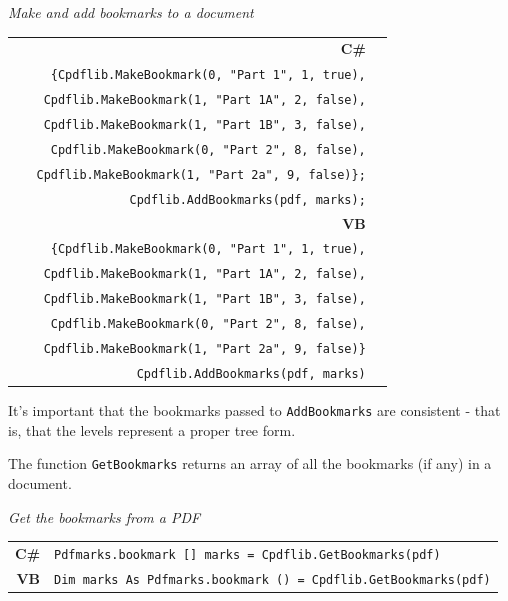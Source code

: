 \documentclass[a4paper]{memoir}
\begin{document}
\begin{framed}
\noindent\textit{Make and add bookmarks to a document}

\vspace{2mm}
\noindent\begin{tabular}{rl}
\small\sffamily\textbf{C\#} &
\begin{minipage}{4in}
\small\verb!Pdfmarks.bookmark [] marks =!\\
\small\verb!  {Cpdflib.MakeBookmark(0, "Part 1", 1, true),!\\
\small\verb!   Cpdflib.MakeBookmark(1, "Part 1A", 2, false),!\\
\small\verb!   Cpdflib.MakeBookmark(1, "Part 1B", 3, false),!\\
\small\verb!   Cpdflib.MakeBookmark(0, "Part 2", 8, false),!\\
\small\verb!   Cpdflib.MakeBookmark(1, "Part 2a", 9, false)};!\\
\small\verb!Cpdflib.AddBookmarks(pdf, marks);!
\end{minipage}\\[18mm]
\small\sffamily\textbf{VB} &
\begin{minipage}{4in}
\small\verb!Dim marks As Pdfmarks.bookmark () =!\\
\small\verb!  {Cpdflib.MakeBookmark(0, "Part 1", 1, true),!\\
\small\verb!   Cpdflib.MakeBookmark(1, "Part 1A", 2, false),!\\
\small\verb!   Cpdflib.MakeBookmark(1, "Part 1B", 3, false),!\\
\small\verb!   Cpdflib.MakeBookmark(0, "Part 2", 8, false),!\\
\small\verb!   Cpdflib.MakeBookmark(1, "Part 2a", 9, false)}!\\
\small\verb!Cpdflib.AddBookmarks(pdf, marks)!
\end{minipage}\\[5mm]
\end{tabular}
\end{framed}
It's important that the bookmarks passed to \verb!AddBookmarks! are consistent - that is, that the levels represent a proper tree form.

The function \verb!GetBookmarks! returns an array of all the bookmarks (if any) in a document.

\begin{framed}
\noindent\textit{Get the bookmarks from a PDF}

\vspace{2mm}
\noindent\begin{tabular}{rl}
\small\sffamily\textbf{C\#} &
\begin{minipage}{4in}
\small\verb!Pdfmarks.bookmark [] marks = Cpdflib.GetBookmarks(pdf)!
\end{minipage}\\[5mm]
\small\sffamily\textbf{VB} &
\begin{minipage}{4in}
\small\verb!Dim marks As Pdfmarks.bookmark () = Cpdflib.GetBookmarks(pdf)!
\end{minipage}\\[5mm]
\end{tabular}
\end{framed}
\end{document}
